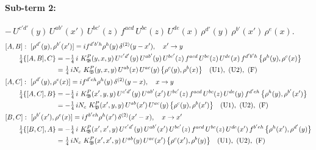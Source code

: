 \documentclass[10pt]{article}
\numberwithin{equation}{section}
\begin{document}
\paragraph{Sub-term 2:} $-\,U^{c'd'}(y)\,U^{ab'}(x')\,U^{bc'}(z)\,f^{acd}\,U^{bc}(z)\,U^{de}(x)\,\rho^{d'}(y)\,\rho^{b'}(x')\,\rho^{e}(x)$.
\begin{align}
&[A,B]:\ [\rho^{d'}(y),\rho^{b'}(x')]=i f^{d'b'h}\rho^{h}(y)\,\delta^{(2)}(y-x'),\quad x'\to y\notag\\
&\qquad \tfrac14\{[A,B],C\}=-\tfrac14\,i\,\,K^{P}_{\mathfrak B}(y,x,y)\,U^{c'd'}(y)\,U^{ab'}(y)\,U^{bc'}(z)\,f^{acd}\,U^{bc}(z)\,U^{de}(x)\,f^{d'b'h}\,\big\{\rho^{h}(y),\rho^{e}(x)\big\}\notag\\
&\qquad\phantom{\tfrac14\{[A,B],C\}}=\tfrac14\,i N_{c}\,\,K^{P}_{\mathfrak B}(y,x,y)\,U^{ab}(x)\,U^{ac}(y)\,\big\{\rho^{c}(y),\rho^{b}(x)\big\}\quad\text{(U1)},\ \text{(U2)},\ \text{(F)}
\label{B:eq:GIII.II.P-2-AB}\\
&[A,C]:\ [\rho^{d'}(y),\rho^{e}(x)]=i f^{d'eh}\rho^{h}(y)\,\delta^{(2)}(y-x),\quad x\to y\notag\\
&\qquad \tfrac14\{[A,C],B\}=-\tfrac14\,i\,\,K^{P}_{\mathfrak B}(x',y,y)\,U^{c'd'}(y)\,U^{ab'}(x')\,U^{bc'}(z)\,f^{acd}\,U^{bc}(z)\,U^{de}(y)\,f^{d'eh}\,\big\{\rho^{h}(y),\rho^{b'}(x')\big\}\notag\\
&\qquad\phantom{\tfrac14\{[A,C],B\}}=-\tfrac14\,i N_{c}\,\,K^{P}_{\mathfrak B}(x',y,y)\,U^{ab}(x')\,U^{ac}(y)\,\big\{\rho^{c}(y),\rho^{b}(x')\big\}\quad\text{(U1)},\ \text{(U2)},\ \text{(F)}
\label{B:eq:GIII.II.P-2-AC}\\
&[B,C]:\ [\rho^{b'}(x'),\rho^{e}(x)]=i f^{b'eh}\rho^{h}(x')\,\delta^{(2)}(x'-x),\quad x\to x'\notag\\
&\qquad \tfrac14\{[B,C],A\}=-\tfrac14\,i\,\,K^{P}_{\mathfrak B}(x',x',y)\,U^{c'd'}(y)\,U^{ab'}(x')\,U^{bc'}(z)\,f^{acd}\,U^{bc}(z)\,U^{de}(x')\,f^{b'eh}\,\big\{\rho^{h}(x'),\rho^{d'}(y)\big\}\notag\\
&\qquad\phantom{\tfrac14\{[B,C],A\}}=\tfrac14\,i N_{c}\,\,K^{P}_{\mathfrak B}(x',x',y)\,U^{ab}(y)\,U^{ac}(x')\,\big\{\rho^{c}(x'),\rho^{b}(y)\big\}\quad\text{(U1)},\ \text{(U2)},\ \text{(F)}
\label{B:eq:GIII.II.P-2-BC}
\end{align}
\end{document}
